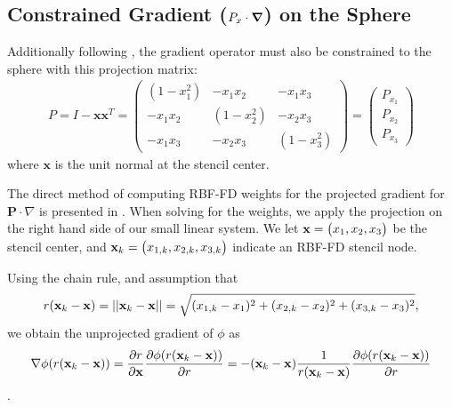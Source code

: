 \documentclass{report}
\begin{document}
{\subsection{Constrained Gradient ($P_{x} \cdot \grad$) on the Sphere}

Additionally following \cite{FlyerWright09, FlyerLehto11}, the gradient operator must also be constrained to the sphere with this projection matrix: 
\begin{align}
P = I - \mathbf{x} \mathbf{x}^T =  \begin{pmatrix} 
(1-x_1^2) & -x_1 x_2 & -x_1 x_3 \\
-x_1 x_2 & (1-x_2^2) & -x_2 x_3 \\ 
-x_1 x_3 & -x_2 x_3 & (1-x_3^2) 
\end{pmatrix} = \begin{pmatrix} P_{x_1} \\ P_{x_2} \\ P_{x_3} \end{pmatrix}
\label{eq:project_gradient}
\end{align}
where $\mathbf{x}$ is the unit normal at the stencil center. 


The direct method of computing RBF-FD weights for the projected gradient for $\mathbf{P} \cdot \nabla $ is presented in \cite{FlyerWright09}. When solving for the weights, we apply the projection on the right hand side of our small linear system. We let $\mathbf{x} = \begin{pmatrix} x_1, x_2, x_3 \end{pmatrix} $ be the stencil center, and $\mathbf{x}_k=\begin{pmatrix} x_{1,k}, x_{2,k}, x_{3,k}\end{pmatrix}$ indicate an RBF-FD stencil node. 

Using the chain rule, and assumption that 
$$r(\mathbf{x}_k-\mathbf{x})=\left|\left|\mathbf{x}_k-\mathbf{x}\right|\right| = \sqrt{(x_{1,k}-x_1)^2 + (x_{2,k}-x_2)^2 + (x_{3,k}-x_3)^2},$$
 we obtain the unprojected gradient of $\phi$ as
$$\nabla \phi(r(\mathbf{x}_k - \mathbf{x})) = \frac{\partial r}{\partial \mathbf{x}} \frac{\partial \phi(r(\mathbf{x}_k - \mathbf{x}))}{\partial r} = - (\mathbf{x}_k - \mathbf{x})\frac{1}{r(\mathbf{x}_k - \mathbf{x})} \frac{\partial \phi(r(\mathbf{x}_k - \mathbf{x}))}{\partial r}$$. 

}
\end{document}
